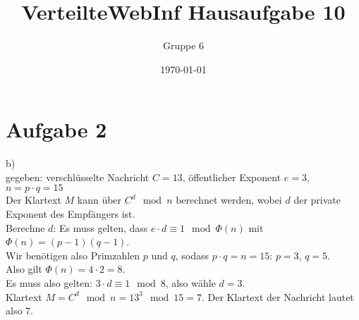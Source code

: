 \documentclass[a4paper]{scrartcl}
\author{Gruppe 6}
\title{\textbf{VerteilteWebInf Hausaufgabe 10}}
\date{\today}
\begin{document}
\maketitle


\section*{Aufgabe 2}
b)\\
gegeben: verschlüsselte Nachricht $C=13$,  öffentlicher Exponent $e=3$, $n=p\cdot q=15$\\

Der Klartext $M$ kann über $C^d \mod n$ berechnet werden, wobei $d$ der private Exponent des Empfängers ist.\\
Berechne $d$: Es muss gelten, dass $e\cdot d \equiv 1 \mod \Phi(n)$ mit $\Phi(n) = (p-1)(q-1)$.\\
Wir benötigen also Primzahlen $p$ und $q$, sodass $p\cdot q = n = 15$: $p=3$, $q=5$.\\
Also gilt $\Phi(n)=4\cdot2=8$.\\
Es muss also gelten: $3\cdot d\equiv1\mod8$, also wähle $d=3$.\\
Klartext $M=C^d \mod n =13^3\mod 15 = 7$.
Der Klartext der Nachricht lautet also $7$.
\end{document}
